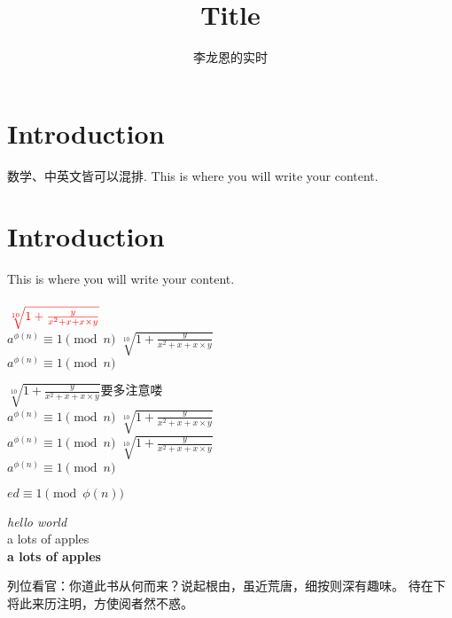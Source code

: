 \documentclass{article}
\title{Title}
\author{李龙恩的实时}
\begin{document}
\maketitle{}
\section{Introduction}
数学、中英文皆可以混排. This is where you will write your content.
\section{Introduction}
This is where you will write your content. \\ \\
$\color{red}{\sqrt[10]{1 + \frac{y}{x^{2} + x + x \times y}}}$ \\
$a^{\phi(n)} \equiv 1 \pmod{n}$
$\sqrt[10]{1 + \frac{y}{x^{2} + x + x \times y}}$ \\
$a^{\phi(n)} \equiv 1 \pmod{n}$

$\sqrt[10]{1 + \frac{y}{x^{2} + x + x \times y}} \textit{要多注意喽}$ \\
$a^{\phi(n)} \equiv 1 \pmod{n}$
$\sqrt[10]{1 + \frac{y}{x^{2} + x + x \times y}}$ \\
$a^{\phi(n)} \equiv 1 \pmod{n}$
$\sqrt[10]{1 + \frac{y}{x^{2} + x + x \times y}}$ \\
$a^{\phi(n)} \equiv 1 \pmod{n}$

$ed \equiv 1 \pmod{\phi(n)}$

\textit{hello world} \\
\textrm{a lots of apples} \\
\textbf{a lots of apples} \\

\begin{pinyinscope}
列位看官：你道此书从何而来？说起根由，虽近荒唐，细按则深有趣味。
待在下将此来历注明，方使阅者然不惑。\\
 \\
{}

\end{pinyinscope}
\end{document}
